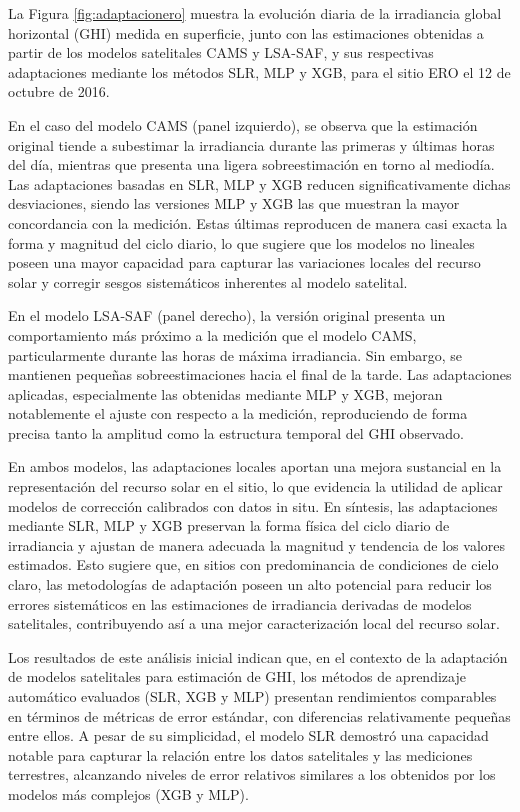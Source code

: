 \documentclass[letterpaper,12pt, twoside]{report}
\providecommand{\DIFdeltex}[1]{{\protect\color{red} \scriptsize #1}} %
\providecommand{\DIFdel}[1]{\texorpdfstring{\DIFdeltex{#1}}{}} %
\begin{document}
\DIFdel{La Figura \ref{fig:adaptacionero} muestra la evolución diaria de la irradiancia global horizontal (GHI) medida en superficie, junto con las estimaciones obtenidas a partir de los modelos satelitales CAMS y LSA-SAF, y sus respectivas adaptaciones mediante los métodos SLR, MLP y XGB, para el sitio ERO el 12 de octubre de 2016.
}%

\DIFdel{En el caso del modelo CAMS (panel izquierdo), se observa que la estimación original tiende a subestimar la irradiancia durante las primeras y últimas horas del día, mientras que presenta una ligera sobreestimación en torno al mediodía. Las adaptaciones basadas en SLR, MLP y XGB reducen significativamente dichas desviaciones, siendo las versiones MLP y XGB las que muestran la mayor concordancia con la medición. Estas últimas reproducen de manera casi exacta la forma y magnitud del ciclo diario, lo que sugiere que los modelos no lineales poseen una mayor capacidad para capturar las variaciones locales del recurso solar y corregir sesgos sistemáticos inherentes al modelo satelital.
}%

\DIFdel{En el modelo LSA-SAF (panel derecho), la versión original presenta un comportamiento más próximo a la medición que el modelo CAMS, particularmente durante las horas de máxima irradiancia. Sin embargo, se mantienen pequeñas sobreestimaciones hacia el final de la tarde. Las adaptaciones aplicadas, especialmente las obtenidas mediante MLP y XGB, mejoran notablemente el ajuste con respecto a la medición, reproduciendo de forma precisa tanto la amplitud como la estructura temporal del GHI observado.
}%

\DIFdel{En ambos modelos, las adaptaciones locales aportan una mejora sustancial en la representación del recurso solar en el sitio, lo que evidencia la utilidad de aplicar modelos de corrección calibrados con datos in situ. En síntesis, las adaptaciones mediante SLR, MLP y XGB preservan la forma física del ciclo diario de irradiancia y ajustan de manera adecuada la magnitud y tendencia de los valores estimados. Esto sugiere que, en sitios con predominancia de condiciones de cielo claro, las metodologías de adaptación poseen un alto potencial para reducir los errores sistemáticos en las estimaciones de irradiancia derivadas de modelos satelitales, contribuyendo así a una mejor caracterización local del recurso solar.
}%

\DIFdel{Los resultados de este análisis inicial indican que, en el contexto de la adaptación de modelos satelitales para estimación de GHI, los métodos de aprendizaje automático evaluados (SLR, XGB y MLP) presentan rendimientos comparables en términos de métricas de error estándar, con diferencias relativamente pequeñas entre ellos. A pesar de su simplicidad, el modelo SLR demostró una capacidad notable para capturar la relación entre los datos satelitales y las mediciones terrestres, alcanzando niveles de error relativos similares a los obtenidos por los modelos más complejos (XGB y MLP).
}%
\end{document}
